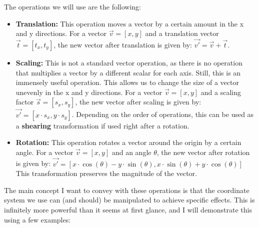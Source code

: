 The operations we will use are the following:
\begin{itemize}
    \item \textbf{Translation:} This operation moves a vector by a certain amount in the x and y directions. For a vector \(\vec{v} = [x, y]\) and a translation vector \(\vec{t} = [t_x, t_y]\), the new vector after translation is given by: \(\vec{v'} = \vec{v} + \vec{t}\).

    \item \textbf{Scaling:} This is not a standard vector operation, as there is no operation that multiplies a vector by a different scalar for each axis. Still, this is an immensely useful operation. This allows us to change the size of a vector unevenly in the x and y directions. For a vector \(\vec{v} = [x, y]\) and a scaling factor \(\vec{s} = [s_x, s_y]\), the new vector after scaling is given by: \(\vec{v'} = [x \cdot s_x, y \cdot s_y]\). Depending on the order of operations, this can be used as a \textbf{shearing} transformation if used right after a rotation.

\pagebreak

    \item \textbf{Rotation:} This operation rotates a vector around the origin by a certain angle. For a vector \(\vec{v} = [x, y]\) and an angle \(\theta\), the new vector after rotation is given by: \linebreak \(\vec{v'} = [x \cdot \cos(\theta) - y \cdot \sin(\theta), x \cdot \sin(\theta) + y \cdot \cos(\theta)]\) This transformation preserves the magnitude of the vector.
\end{itemize}

\vspace{5mm}

The main concept I want to convey with these operations is that the coordinate system we use can (and should) be manipulated to achieve specific effects. This is infinitely more powerful than it seems at first glance, and I will demonstrate this using a few examples:

